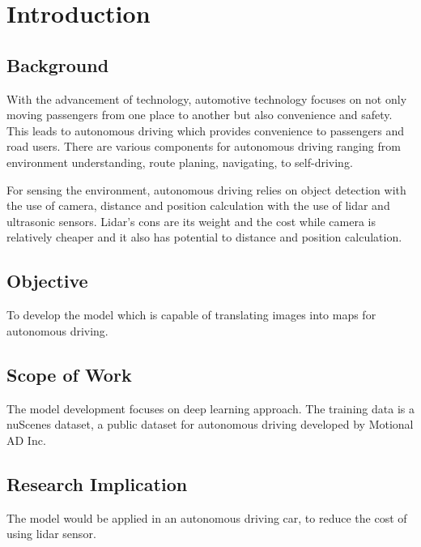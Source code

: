 \chapter{Introduction}


\section{Background}
With the advancement of technology, automotive technology focuses on not only moving passengers from one place to another but also convenience and safety. This leads to autonomous driving which provides convenience to passengers and road users. There are various components for autonomous driving ranging from environment understanding, route planing, navigating, to self-driving.

For sensing the environment, autonomous driving relies on object detection with the use of camera, distance and position calculation with the use of lidar and ultrasonic sensors. Lidar's cons are its weight and the cost while camera is relatively cheaper and it also has potential to distance and position calculation.


\section{Objective}
To develop the model which is capable of translating images into maps for autonomous driving.


\section{Scope of Work}
The model development focuses on deep learning approach. The training data is a nuScenes dataset, a public dataset for autonomous driving developed by Motional AD Inc.


\section{Research Implication}
The model would be applied in an autonomous driving car, to reduce the cost of using lidar sensor.

